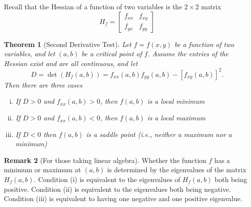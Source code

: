 \documentclass[10pt]{article}
\newtheorem{theorem}{Theorem}
\theoremstyle{definition}
\newtheorem{remark}[theorem]{Remark}
\newcommand{\1}[1]{\textbf{1}_{\left[#1\right]}} %
\begin{document}
Recall that the Hessian of a function of two variables is the $2\times 2$
matrix
\begin{equation*}
  H_{f} = \begin{bmatrix}
    f_{xx}&f_{xy}\\
    f_{yx}&f_{yy}
  \end{bmatrix}
\end{equation*}


\begin{theorem}[Second Derivative Test]
  \label{thm:second-derivative-test}
  Let $f=f(x,y)$ be a function of two variables, and let $(a,b)$ be a
  critical point of $f$. Assume the entries of the Hessian exist and are all
  continuous, and let
  \begin{equation*}
    D = \det(H_{f}(a,b)) = f_{xx}(a,b)f_{yy}(a,b)- \left[ f_{xy}(a,b) \right]^{2}. 
  \end{equation*}
  Then there are three cases
  \begin{enumerate}[(i)]
    \item If $D>0$ and $f_{xx}(a,b)>0$, then $f(a,b)$ is a local minimum
    \item If $D>0$ and $f_{xx}(a,b)<0$, then $f(a,b)$ is a local maximum
    \item If $D<0$ then $f(a,b)$ is a saddle point (i.e., neither a maximum
    nor a minimum)
  \end{enumerate}
\end{theorem}

\begin{remark}[For those taking linear algebra]
  Whether the function $f$ has a minimum or maximum at $(a,b)$ is determined
  by the eigenvalues of the matrix $H_{f}(a,b)$. Condition (i) is equivalent
  to the eigenvalues of $H_{f}(a,b)$ both being positive. Condition (ii) is
  equivalent to the eigenvalues both being negative. Condition (iii) is
  equivalent to having one negative and one positive eigenvalue.
\end{remark}
\end{document}
